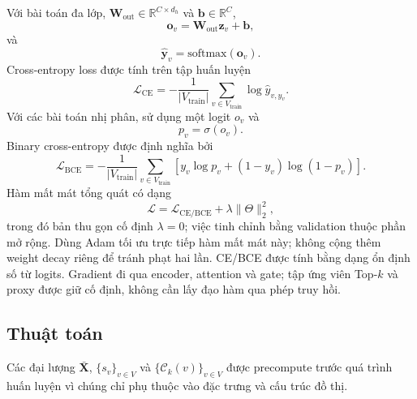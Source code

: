 \documentclass[12pt,a4paper]{article}
\numberwithin{equation}{section}
\theoremstyle{definition}
\begin{document}
Với bài toán đa lớp, $\mathbf{W}_{\text{out}}\in\mathbb{R}^{C\times d_h}$ và $\mathbf{b}\in\mathbb{R}^C$,
\begin{equation}
\mathbf{o}_v = \mathbf{W}_{\text{out}}\mathbf{z}_v + \mathbf{b},
\end{equation}
và
\begin{equation}
\hat{\mathbf{y}}_v = \text{softmax}(\mathbf{o}_v).
\end{equation}
Cross-entropy loss được tính trên tập huấn luyện
\begin{equation}
\mathcal{L}_{\text{CE}} = -\frac{1}{|V_{\text{train}}|} \sum_{v \in V_{\text{train}}} \log \hat{y}_{v, y_v}.
\end{equation}
Với các bài toán nhị phân, sử dụng một logit $o_v$ và
\begin{equation}
p_v = \sigma(o_v).
\end{equation}
Binary cross-entropy được định nghĩa bởi
\begin{equation}
\mathcal{L}_{\text{BCE}} = -\frac{1}{|V_{\text{train}}|} \sum_{v \in V_{\text{train}}} \left[y_v \log p_v + (1 - y_v)\log(1 - p_v)\right].
\end{equation}
Hàm mất mát tổng quát có dạng
\begin{equation}
\mathcal{L} = \mathcal{L}_{\text{CE/BCE}} + \lambda \|\Theta\|_2^2,
\end{equation}
trong đó bản thu gọn cố định $\lambda=0$; việc tinh chỉnh bằng validation thuộc phần mở rộng. Dùng Adam tối ưu trực tiếp hàm mất mát này; không cộng thêm weight decay riêng để tránh phạt hai lần. CE/BCE được tính bằng dạng ổn định số từ logits. Gradient đi qua encoder, attention và gate; tập ứng viên Top-$k$ và proxy được giữ cố định, không cần lấy đạo hàm qua phép truy hồi.

\subsection{Thuật toán}
Các đại lượng $\bar{\mathbf{X}}$, $\{s_v\}_{v \in V}$ và $\{\mathcal{C}_k(v)\}_{v \in V}$ được precompute trước quá trình huấn luyện vì chúng chỉ phụ thuộc vào đặc trưng và cấu trúc đồ thị.
\end{document}

